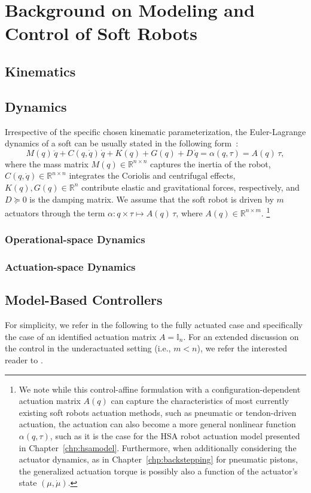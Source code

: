\chapter{Background on Modeling and Control of Soft Robots}\label{chp:background}
\section{Kinematics}
\section{Dynamics}
Irrespective of the specific chosen kinematic parameterization, the Euler-Lagrange dynamics of a soft can be usually stated in the following form~\citep{della2023model}:
\begin{equation}
    M(q) \, \ddot{q} + C(q, \dot{q}) \, \dot{q} + K(q) + G(q) + D \, \dot{q} = \alpha(q,\tau) = A(q) \, \tau,
\end{equation}
where the mass matrix $M(q) \in \mathbb{R}^{n \times n}$
captures the inertia of the robot, $C(q,\dot{q}) \in \mathbb{R}^{n \times n}$ integrates the Coriolis and centrifugal effects, $K(q), G(q) \in \mathbb{R}^{n}$ contribute elastic and gravitational forces, respectively, and $D \succeq 0$ is the damping matrix.
We assume that the soft robot is driven by $m$ actuators through the term $\alpha: q \times \tau \mapsto A(q) \, \tau$, where $A(q) \in \mathbb{R}^{n \times m}$.
\footnote{We note while this control-affine formulation with a configuration-dependent actuation matrix $A(q)$ can capture the characteristics of most currently existing soft robots actuation methods, such as pneumatic or tendon-driven actuation, the actuation can also become a more general nonlinear function $\alpha(q,\tau)$, such as it is the case for the \gls{HSA} robot actuation model presented in Chapter~\ref{chp:hsamodel}. Furthermore, when additionally considering the actuator dynamics, as in Chapter~\ref{chp:backstepping} for pneumatic pistons, the generalized actuation torque is possibly also a function of the actuator's state $(\mu,\dot{\mu})$.}




\subsection{Operational-space Dynamics}

\subsection{Actuation-space Dynamics}

\section{Model-Based Controllers}
For simplicity, we refer in the following to the fully actuated case and specifically the case of an identified actuation matrix $A = \mathbb{I}_n$.
For an extended discussion on the control in the underactuated setting (i.e., $m < n$), we refer the interested reader to \citet{pustina2025analysis}.